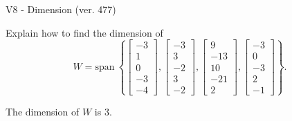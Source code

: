 \begin{exercise}
  \begin{exerciseTitle}V8 - Dimension (ver. 477)\end{exerciseTitle}
  \begin{exerciseStatement}
    Explain how to find the dimension of 
\[W=\mathrm{span}\ \left\{\left[\begin{array}{r}
-3 \\
1 \\
0 \\
-3 \\
-4
\end{array}\right] , \left[\begin{array}{r}
-3 \\
3 \\
-2 \\
3 \\
-2
\end{array}\right] , \left[\begin{array}{r}
9 \\
-13 \\
10 \\
-21 \\
2
\end{array}\right] , \left[\begin{array}{r}
-3 \\
0 \\
-3 \\
2 \\
-1
\end{array}\right]\right\}.\]



  \end{exerciseStatement}
  \begin{exerciseAnswer}
   The dimension of \(W\) is  \(3\).
  


  \end{exerciseAnswer}
\end{exercise}